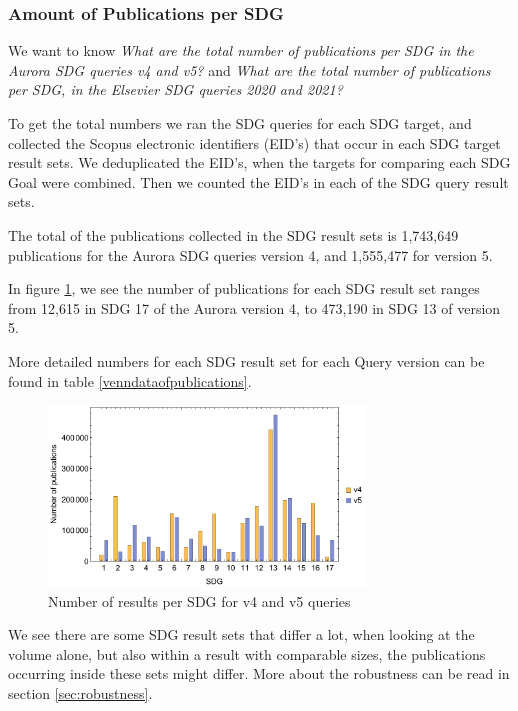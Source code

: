 \documentclass{article}
\begin{document}

\subsubsection{Amount of Publications per SDG}
We want to know \emph{What are the total number of publications per SDG in the Aurora SDG queries v4 and v5?} and \emph{What are the total number of  publications per SDG, in the Elsevier SDG queries 2020 and 2021?}

To get the total numbers we ran the  SDG queries for each SDG target, and collected the Scopus electronic identifiers (EID's) that occur in each SDG target result sets. We deduplicated the EID's, when the targets for comparing each SDG Goal were combined. Then we counted the EID's in each of the SDG query result sets.

The total of the publications collected in the SDG result sets is 1,743,649 publications for the Aurora SDG queries version 4, and 1,555,477 for version 5.

In figure \ref{numberofresults}, we see the number of publications for each SDG result set ranges from 12,615 in SDG 17 of the Aurora version 4, to 473,190 in SDG 13 of version 5.

More detailed numbers for each SDG result set for each Query version can be found in table \ref{venndataofpublications}.

\begin{figure}[ht]
	\centering
  \includegraphics[width=0.75\textwidth]{figures/numberofresultsv4vsv5.pdf}
	\caption{Number of results per SDG for v4 and v5 queries}
	\label{numberofresults}
\end{figure}

We see there are some SDG result sets that differ a lot, when looking at the volume alone, but also within a result with comparable sizes, the publications occurring inside these sets might differ. More about the robustness can be read in section \ref{sec:robustness}.
\end{document}
